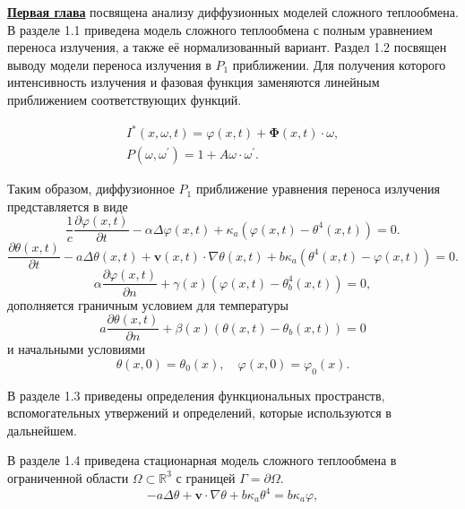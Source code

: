 \underline{\textbf{Первая глава}} посвящена анализу
диффузионных моделей сложного теплообмена.
В разделе 1.1 приведена модель сложного теплообмена с
полным уравнением переноса излучения, а также её нормализованный вариант.
Раздел 1.2 посвящен выводу модели переноса излучения в
$P_1$ приближении.
Для получения которого интенсивность излучения и фазовая функция заменяются линейным приближением
соответствующих функций.

\begin{gather*}
    I^{*}(x, \omega, t) = \varphi(x, t)
    +\boldsymbol{\Phi}(x, t) \cdot \omega, \label{eq:1_2:14}\\
    P\left(\omega, \omega^{\prime}\right)= 1
    + A \omega \cdot \omega^{\prime}. \label{eq:1_2:15}
\end{gather*}

Таким образом, диффузионное $P_1$ приближение уравнения переноса излучения
представляется в виде
\begin{equation}
    \label{eq:1_2:21}
    \frac{1}{c} \frac{\partial \varphi(x, t)}{\partial t}-\alpha \Delta
    \varphi(x, t)+\kappa_{a}\left(\varphi(x, t)-\theta^{4}(x, t)\right)=0.
\end{equation}
\begin{equation}
    \label{eq:1_2:23}
    \frac{\partial \theta(x, t)}{\partial t}-a \Delta \theta(x, t)+\mathbf{v}(x, t) \cdot \nabla
    \theta(x, t)+b \kappa_{a}\left(\theta^{4}(x, t)-\varphi(x, t)\right)=0.
\end{equation}
\begin{equation}
    \label{eq:1_2:24}
    \alpha \frac{\partial \varphi(x, t)}{\partial n}+
    \gamma(x)\left(\varphi(x, t)-\theta_{b}^{4}(x, t)\right)=0,
\end{equation}
дополняется граничным условием для температуры
\begin{equation}
    \label{eq:1_2:25}
    a \frac{\partial \theta(x, t)}{\partial n}
    +\beta(x)\left(\theta(x, t)-\theta_{b}(x, t)\right)=0
\end{equation}
и начальными условиями
\begin{equation}
    \label{eq:1_2:26}
    \theta(x, 0)=\theta_{0}(x), \quad \varphi(x, 0)=\varphi_{0}(x).
\end{equation}

В разделе 1.3 приведены определения функциональных пространств, вспомогательных утвержений и определений,
которые используются в дальнейшем.

В разделе 1.4 приведена стационарная модель сложного теплообмена
в ограниченной области $\Omega \subset \mathbb{R}^3$ с границей $\Gamma=\partial \Omega$.
\begin{equation}
    \label{eq:1_4:4-1}
    -a \Delta \theta + \textbf{v} \cdot \nabla \theta
    + b \kappa_a \theta^4 =  b \kappa_a \varphi,
\end{equation}

